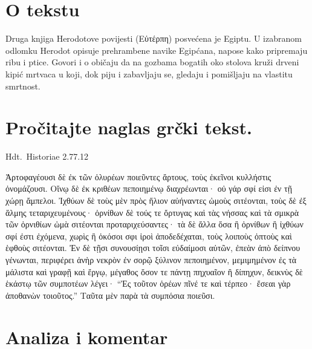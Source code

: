 

\section*{O tekstu}

Druga knjiga Herodotove povijesti \textgreek[variant=ancient]{(Εὐτέρπη)} posvećena je Egiptu. U izabranom odlomku Herodot opisuje prehrambene navike Egipćana, napose kako pripremaju ribu i ptice. Govori i o običaju da na gozbama bogatih oko stolova kruži drveni kipić mrtvaca u koji, dok piju i zabavljaju se, gledaju i pomišljaju na vlastitu smrtnost.


\section*{Pročitajte naglas grčki tekst.}

Hdt.\ Historiae 2.77.12


\medskip

\begin{greek}
{\large
{ \noindent Ἀρτοφαγέουσι δὲ ἐκ τῶν ὀλυρέων ποιεῦντες ἄρτους, τοὺς ἐκεῖνοι κυλλήστις ὀνομάζουσι. Οἴνῳ δὲ ἐκ κριθέων πεποιημένῳ διαχρέωνται· οὐ γάρ σφί εἰσι ἐν τῇ χώρῃ ἄμπελοι. Ἰχθύων δὲ τοὺς μὲν πρὸς ἥλιον αὐήναντες ὠμοὺς σιτέονται, τοὺς δὲ ἐξ ἅλμης τεταριχευμένους· ὀρνίθων δὲ τούς τε ὄρτυγας καὶ τὰς νήσσας καὶ τὰ σμικρὰ τῶν ὀρνιθίων ὠμὰ σιτέονται προταριχεύσαντες· τὰ δὲ ἄλλα ὅσα ἢ ὀρνίθων ἢ ἰχθύων σφί ἐστι ἐχόμενα, χωρὶς ἢ ὁκόσοι σφι ἱροὶ ἀποδεδέχαται, τοὺς λοιποὺς ὀπτοὺς καὶ ἑφθοὺς σιτέονται. Ἐν δὲ τῇσι συνουσίῃσι τοῖσι εὐδαίμοσι αὐτῶν, ἐπεὰν ἀπὸ δείπνου γένωνται, περιφέρει ἀνὴρ νεκρὸν ἐν σορῷ ξύλινον πεποιημένον, μεμιμημένον ἐς τὰ μάλιστα καὶ γραφῇ καὶ ἔργῳ, μέγαθος ὅσον τε πάντῃ πηχυαῖον ἢ δίπηχυν, δεικνὺς δὲ ἑκάστῳ τῶν συμποτέων λέγει· ``Ἐς τοῦτον ὁρέων πῖνέ τε καὶ τέρπεο· ἔσεαι γὰρ ἀποθανὼν τοιοῦτος.'' Ταῦτα μὲν παρὰ τὰ συμπόσια ποιεῦσι.

}
}
\end{greek}

\section*{Analiza i komentar}


